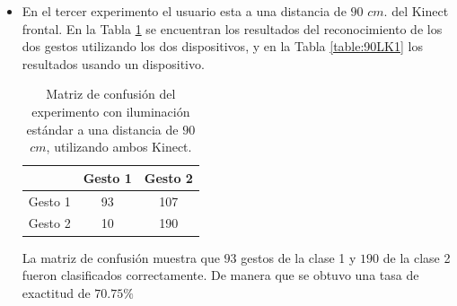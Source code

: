 \begin{itemize}
La matriz de confusión muestra que $88$ gestos de la clase 1 y $183$ de la clase 2 fueron clasificados correctamente. De manera que se obtuvo una tasa de exactitud de $70.5\%$ 

En este experimento la exactitud del reconocimiento es baja para el uso de ambos o un dispositivo Kinect. Se observa que clasifica los gestos de la clase uno como de la clase dos, esto es debido a la calidad de la imágenes debido a que el sensor no siempre proporciona información detallada o completa de la mano.  



\item En el tercer experimento el usuario esta a una distancia de $90$ $cm.$ del Kinect frontal. En la Tabla \ref{table:90LK2} se encuentran los resultados del reconocimiento de los dos gestos utilizando los dos dispositivos, y en la Tabla \ref{table:90LK1} los resultados usando un dispositivo.   
 

\begin{table}[h!] 
\begin{center}
\caption{Matriz de confusión del experimento con iluminación estándar a una distancia de $90$ $cm$, utilizando ambos Kinect.}
\label{table:90LK2}
\begin{tabular}{ r || c | c |} 
        & Gesto 1 & Gesto 2 \\ \hline \hline  
Gesto 1 &  93    & 107      \\ \hline  
Gesto 2 &  10    & 190     \\   
\end{tabular}
\end{center} 
\end{table} 

La matriz de confusión muestra que $93$ gestos de la clase 1 y $190$ de la clase 2 fueron clasificados correctamente. De manera que se obtuvo una tasa de exactitud de $70.75\%$ 


\end{itemize}
